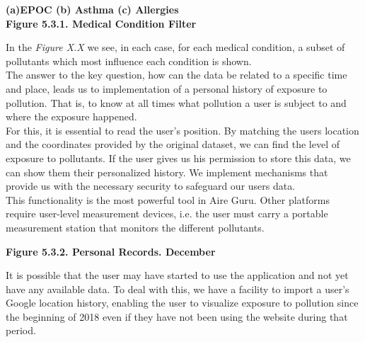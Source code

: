 \begin{center}
  \bf{ (a)EPOC (b) Asthma (c) Allergies\\
  
  Figure 5.3.1. Medical Condition Filter}
\end{center} 

In the \textit{Figure X.X} we see, in each case, for each medical condition, a subset of pollutants which most influence each condition is shown.\\
  
The answer to the key question, how can the data be related to a specific time and place, leads us to
implementation of a personal history of exposure to pollution. That is, to know at all times what pollution
a user is subject to and where the exposure happened.\\

For this, it is essential to read the user's position. By matching the users location and the coordinates provided by the original dataset,
we can find the level of exposure to pollutants. If the user gives us his permission to store this data, we can show them their personalized history.
We implement mechanisms that provide us with the necessary security to safeguard our users data.\\

This functionality is the most powerful tool in Aire Guru. Other platforms require user-level measurement devices, i.e. the user must carry
a portable measurement station that monitors the different pollutants.\\

\begin{center}
  \bf{ 
  Figure 5.3.2. Personal Records. December}
\end{center} 

It is possible that the user may have started to use the application and not yet have any available data.
To deal with this, we have a facility to import a user's Google location history, enabling the user to visualize
exposure to pollution since the beginning of 2018 even if they have not been using the website during that period.\\

